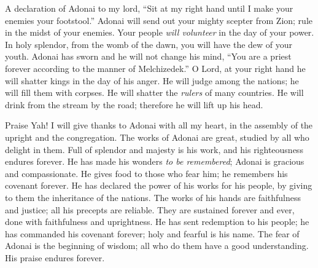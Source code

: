 \begin{biblechapter} %
 A declaration of Adonai to my lord, 
“Sit at my right hand 
until I make your enemies your footstool.”
\verse Adonai will send out your mighty scepter from Zion; 
rule in the midst of your enemies.
\verse Your people \textit{will volunteer} in the day of your power. 
In holy splendor, from the womb of the dawn, 
you will have the dew of your youth.
\verse Adonai has sworn and he will not change his mind, 
“You are a priest forever 
according to the manner of Melchizedek.”
\verse O Lord, at your right hand 
he will shatter kings in the day of his anger.
\verse He will judge among the nations; 
he will fill them with corpses. 
He will shatter the \textit{rulers} of many countries.
\verse He will drink from the stream by the road; 
therefore he will lift up his head.
\end{biblechapter}

\begin{biblechapter} %
 Praise Yah! 
I will give thanks to Adonai with all my heart, 
in the assembly of the upright and the congregation.
\verse The works of Adonai are great, 
studied by all who delight in them.
\verse Full of splendor and majesty is his work, 
and his righteousness endures forever.
\verse He has made his wonders \textit{to be remembered}; 
Adonai is gracious and compassionate.
\verse He gives food to those who fear him; 
he remembers his covenant forever.
\verse He has declared the power of his works for his people, 
by giving to them the inheritance of the nations.
\verse The works of his hands are faithfulness and justice; 
all his precepts are reliable.
\verse They are sustained forever and ever, 
done with faithfulness and uprightness.
\verse He has sent redemption to his people; 
he has commanded his covenant forever; 
holy and fearful is his name.
\verse The fear of Adonai is the beginning of wisdom; 
all who do them have a good understanding. 
His praise endures forever.
\end{biblechapter}

